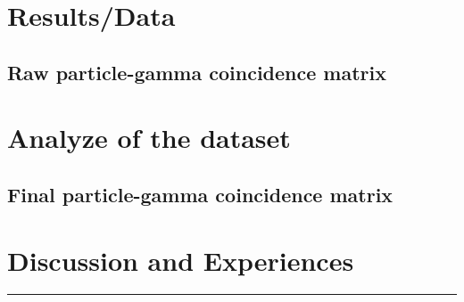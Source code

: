 \documentclass[11pt,a4wide]{article}
\begin{document}
\section{Results/Data}
\subsection{Raw particle-gamma coincidence matrix}

\section{Analyze of the dataset}
\subsection{Final particle-gamma coincidence matrix}


\section{Discussion and Experiences}


\noindent\rule{\textwidth}{1pt}
\end{document}
